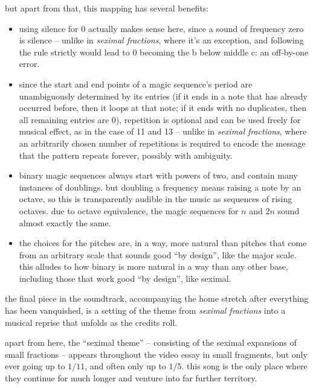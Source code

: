 \documentclass[a4paper, 12pt]{report}
\begin{document}
but apart from that, this mapping has several benefits: \bigskip

\begin{itemize}
	\item using silence for 0 actually makes sense here, since a sound of frequency zero is silence -- unlike in {\it seximal fractions}, where it's an exception, and following the rule strictly would lead to 0 becoming the {\sc b} below middle {\sc c}: an off-by-one error.
	\item since the start and end points of a magic sequence's period are unambiguously determined by its entries (if it ends in a note that has already occurred before, then it loops at that note; if it ends with no duplicates, then all remaining entries are 0), repetition is optional and can be used freely for musical effect, as in the case of 11 and 13 -- unlike in {\it seximal fractions}, where an arbitrarily chosen number of repetitions is required to encode the message that the pattern repeats forever, possibly with ambiguity.
	\item binary magic sequences always start with powers of two, and contain many instances of doublings. but doubling a frequency means raising a note by an octave, so this is transparently audible in the music as sequences of rising octaves. due to octave equivalence, the magic sequences for $n$ and $2n$ sound almost exactly the same.
	\item the choices for the pitches are, in a way, more natural than pitches that come from an arbitrary scale that sounds good ``by design'', like the major scale. this alludes to how binary is more natural in a way than any other base, including those that work good ``by design'', like seximal.
\end{itemize}

\newpage


the final piece in the soundtrack, accompanying the home stretch after everything has been vanquished, is a setting of the theme from {\it seximal fractions} into a musical reprise that unfolds as the credits roll.

apart from here, the ``seximal theme'' -- consisting of the seximal expansions of small fractions -- appears throughout the video essay in small fragments, but only ever going up to $1/11$, and often only up to $1/5$. this song is the only place where they continue for much longer and venture into far further territory.
\end{document}
